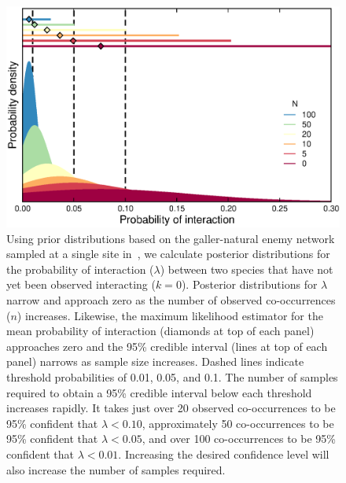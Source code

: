 \documentclass[12pt]{article}
\begin{document}
  \begin{figure}[h!]
    \caption{Using prior distributions based on the galler-natural enemy network sampled at a single site in~\citet{Kopelke2017}, we calculate posterior distributions for the probability of interaction ($\lambda$) between two species that have not yet been observed interacting ($k = 0$). 
    Posterior distributions for $\lambda$ narrow and approach zero as the number of observed co-occurrences ($n$) increases. Likewise, the maximum likelihood estimator for the mean probability of interaction (diamonds at top of each panel) approaches zero and the 95\% credible interval (lines at top of each panel) narrows as sample size increases.
    Dashed lines indicate threshold probabilities of 0.01, 0.05, and 0.1. The number of samples required to obtain a 95\% credible interval below each threshold increases rapidly. It takes just over 20 observed co-occurrences to be 95\% confident that $\lambda<0.10$, approximately 50 co-occurrences to be 95\% confident that $\lambda<0.05$, and over 100 co-occurrences to be 95\% confident that $\lambda<0.01$. Increasing the desired confidence level will also increase the number of samples required.
    }
    \label{Salix_pdfs_cdfs}
    \begin{center}
    \includegraphics*[width=.8\textwidth]{figures/GP_pdfs_increasing_N_Zillis.eps}
    \end{center}
    \end{figure}
\end{document}
